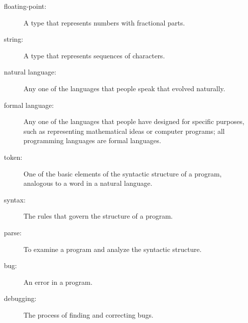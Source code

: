 \begin{description}
\item[floating-point:] A type that represents numbers with fractional
parts.

\item[string:] A type that represents sequences of characters.

\item[natural language:]  Any one of the languages that people speak that
evolved naturally.

\item[formal language:]  Any one of the languages that people have designed
for specific purposes, such as representing mathematical ideas or
computer programs; all programming languages are formal languages.

\item[token:]  One of the basic elements of the syntactic structure of
a program, analogous to a word in a natural language.

\item[syntax:] The rules that govern the structure of a program.

\item[parse:] To examine a program and analyze the syntactic structure.

\item[bug:] An error in a program.

\item[debugging:] The process of finding and correcting bugs.

\end{description}


